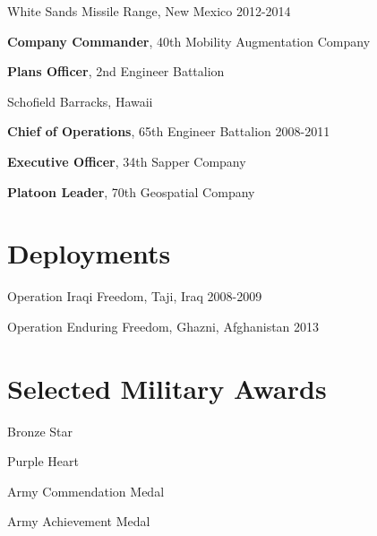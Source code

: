 \documentclass[11pt,]{article}
\providecommand{\tightlist}{%
  \setlength{\itemsep}{0pt}\setlength{\parskip}{0pt}}
\renewenvironment{itemize}{
  \begin{list}{}{
    \setlength{\leftmargin}{1.5em}
  }
}{
  \end{list}
}
\begin{document}
\begin{itemize}
\tightlist
\item
  White Sands Missile Range, New Mexico \hfill 2012-2014

  \begin{itemize}
  \tightlist
  \item
    \textbf{Company Commander}, 40th Mobility Augmentation Company
  \item
    \textbf{Plans Officer}, 2nd Engineer Battalion\\
  \end{itemize}
\item
  Schofield Barracks, Hawaii

  \begin{itemize}
  \tightlist
  \item
    \textbf{Chief of Operations}, 65th Engineer Battalion
    \hfill 2008-2011
  \item
    \textbf{Executive Officer}, 34th Sapper Company
  \item
    \textbf{Platoon Leader}, 70th Geospatial Company
  \end{itemize}
\end{itemize}

\hypertarget{deployments}{%
\section{Deployments}\label{deployments}}

\begin{itemize}
\tightlist
\item
  Operation Iraqi Freedom, Taji, Iraq \hfill 2008-2009
\item
  Operation Enduring Freedom, Ghazni, Afghanistan \hfill 2013
\end{itemize}

\hypertarget{selected-military-awards}{%
\section{Selected Military Awards}\label{selected-military-awards}}

\begin{itemize}
\tightlist
\item
  Bronze Star
\item
  Purple Heart
\item
  Army Commendation Medal
\item
  Army Achievement Medal
\end{itemize}
\end{document}
